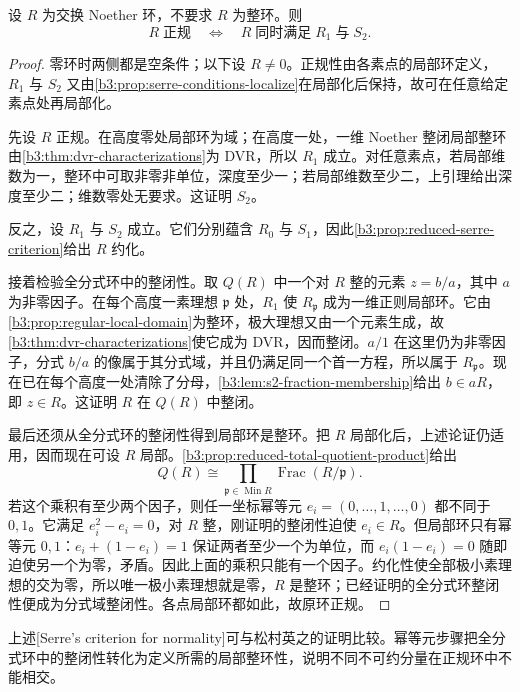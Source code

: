 \begin{theorem}\label{b3:thm:serre-normality}
	设 \(R\) 为交换 Noether 环，不要求 \(R\) 为整环。则
	\[
		R\;\text{正规}\quad\Longleftrightarrow\quad R\;\text{同时满足}\;R_1\;\text{与}\;S_2.
	\]
\end{theorem}
\begin{proof}
	零环时两侧都是空条件；以下设 \(R\ne0\)。正规性由各素点的局部环定义，\(R_1\) 与 \(S_2\) 又由\cref{b3:prop:serre-conditions-localize}在局部化后保持，故可在任意给定素点处再局部化。

	先设 \(R\) 正规。在高度零处局部环为域；在高度一处，一维 Noether 整闭局部整环由\cref{b3:thm:dvr-characterizations}为 DVR，所以 \(R_1\) 成立。对任意素点，若局部维数为一，整环中可取非零非单位，深度至少一；若局部维数至少二，上引理给出深度至少二；维数零处无要求。这证明 \(S_2\)。

	反之，设 \(R_1\) 与 \(S_2\) 成立。它们分别蕴含 \(R_0\) 与 \(S_1\)，因此\cref{b3:prop:reduced-serre-criterion}给出 \(R\) 约化。

	接着检验全分式环中的整闭性。取 \(Q(R)\) 中一个对 \(R\) 整的元素 \(z=b/a\)，其中 \(a\) 为非零因子。在每个高度一素理想 \(\mathfrak p\) 处，\(R_1\) 使 \(R_{\mathfrak p}\) 成为一维正则局部环。它由\cref{b3:prop:regular-local-domain}为整环，极大理想又由一个元素生成，故\cref{b3:thm:dvr-characterizations}使它成为 DVR，因而整闭。\(a/1\) 在这里仍为非零因子，分式 \(b/a\) 的像属于其分式域，并且仍满足同一个首一方程，所以属于 \(R_{\mathfrak p}\)。现在已在每个高度一处清除了分母，\cref{b3:lem:s2-fraction-membership}给出 \(b\in aR\)，即 \(z\in R\)。这证明 \(R\) 在 \(Q(R)\) 中整闭。

	最后还须从全分式环的整闭性得到局部环是整环。把 \(R\) 局部化后，上述论证仍适用，因而现在可设 \(R\) 局部。\cref{b3:prop:reduced-total-quotient-product}给出
	\[
		Q(R)\cong\prod_{\mathfrak p\in\operatorname{Min}R}\operatorname{Frac}(R/\mathfrak p).
	\]
	若这个乘积有至少两个因子，则任一坐标幂等元 \(e_i=(0,\ldots,1,\ldots,0)\) 都不同于 \(0,1\)。它满足 \(e_i^2-e_i=0\)，对 \(R\) 整，刚证明的整闭性迫使 \(e_i\in R\)。但局部环只有幂等元 \(0,1\)：\(e_i+(1-e_i)=1\) 保证两者至少一个为单位，而 \(e_i(1-e_i)=0\) 随即迫使另一个为零，矛盾。因此上面的乘积只能有一个因子。约化性使全部极小素理想的交为零，所以唯一极小素理想就是零，\(R\) 是整环；已经证明的全分式环整闭性便成为分式域整闭性。各点局部环都如此，故原环正规。
\end{proof}

上述[Serre's criterion for normality]可与松村英之的证明比较\cite[Theorem 23.8, pp. 183--184]{Matsumura1989CommutativeRingTheory}。幂等元步骤把全分式环中的整闭性转化为定义所需的局部整环性，说明不同不可约分量在正规环中不能相交。

